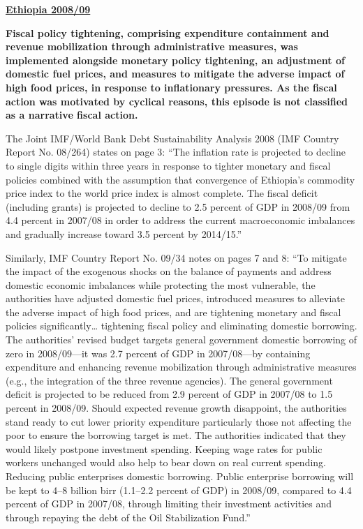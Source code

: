 \textbf{\underline{Ethiopia 2008/09}}

\textbf{Fiscal policy tightening, comprising expenditure containment and revenue mobilization through administrative measures, was implemented alongside monetary policy tightening, an adjustment of domestic fuel prices, and measures to mitigate the adverse impact of high food prices, in response to inflationary pressures. As the fiscal action was motivated by cyclical reasons, this episode is not classified as a narrative fiscal action.}

The Joint IMF/World Bank Debt Sustainability Analysis 2008 (IMF Country Report No. 08/264) states on page 3: “The inflation rate is projected to decline to single digits within three years in response to tighter monetary and fiscal policies combined with the assumption that convergence of Ethiopia’s commodity price index to the world price index is almost complete. The fiscal deficit (including grants) is projected to decline to 2.5 percent of GDP in 2008/09 from 4.4 percent in 2007/08 in order to address the current macroeconomic imbalances and gradually increase toward 3.5 percent by 2014/15.”

Similarly, IMF Country Report No. 09/34 notes on pages 7 and 8: “To mitigate the impact of the exogenous shocks on the balance of payments and address domestic economic imbalances while protecting the most vulnerable, the authorities have adjusted domestic fuel prices, introduced measures to alleviate the adverse impact of high food prices, and are tightening monetary and fiscal policies significantly… tightening fiscal policy and eliminating domestic borrowing. The authorities’ revised budget targets general government domestic borrowing of zero in 2008/09—it was 2.7 percent of GDP in 2007/08—by containing expenditure and enhancing revenue mobilization through administrative measures (e.g., the integration of the three revenue agencies). The general government deficit is projected to be reduced from 2.9 percent of GDP in 2007/08 to 1.5 percent in 2008/09. Should expected revenue growth disappoint, the authorities stand ready to cut lower priority expenditure particularly those not affecting the poor to ensure the borrowing target is met. The authorities indicated that they would likely postpone investment spending. Keeping wage rates for public workers unchanged would also help to bear down on real current spending. 
Reducing public enterprises domestic borrowing. Public enterprise borrowing will be kept to 4–8 billion birr (1.1–2.2 percent of GDP) in 2008/09, compared to 4.4 percent of GDP in 2007/08, through limiting their investment activities and through repaying the debt of the Oil Stabilization Fund.”

